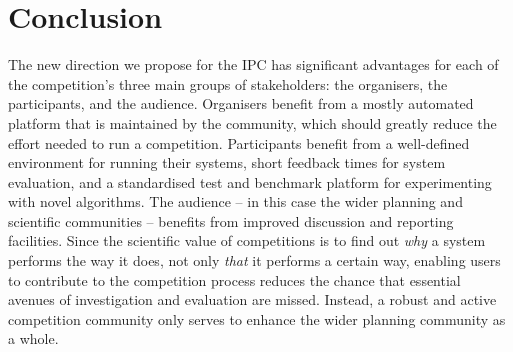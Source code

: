 \section{Conclusion}
\label{sec:conclusion}


The new direction we propose for the IPC has significant advantages for
each of the competition's three main groups of stakeholders: the
organisers, the participants, and the audience.  Organisers benefit from a
mostly automated platform that is maintained by the community, which should
greatly reduce the effort needed to run a competition. Participants benefit
from a well-defined environment for running their systems, short feedback
times for system evaluation, and a standardised test and benchmark platform
for experimenting with novel algorithms. The audience -- in this case the
wider planning and scientific communities -- benefits from improved
discussion and reporting facilities. Since the scientific value of
competitions is to find out \emph{why} a system performs the way it does,
not only \emph{that} it performs a certain way, enabling users to
contribute to the competition process reduces the chance that essential
avenues of investigation and evaluation are missed. Instead, a robust and
active competition community only serves to enhance the wider planning
community as a whole.



  
  

  
  









